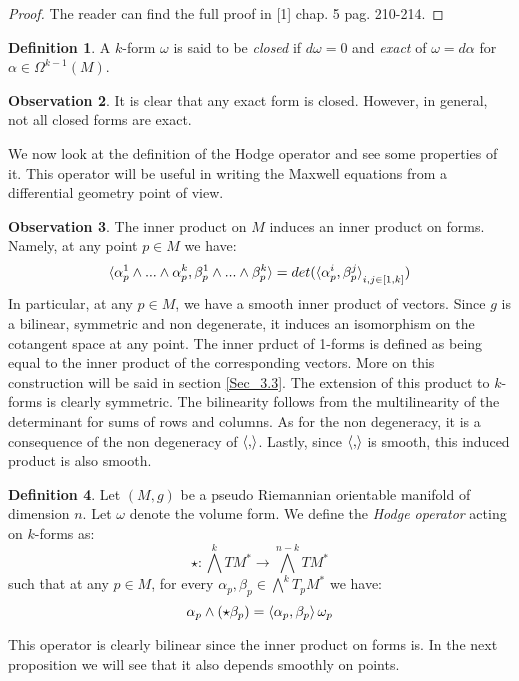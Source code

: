 \documentclass[12pt,a4paper]{report}
\theoremstyle{definition}
\newtheorem{Def}{Definition}[chapter]
\theoremstyle{Theorem}
\theoremstyle{definition}
\theoremstyle{definition}
\newtheorem{Obs}[Def]{Observation}
\begin{document}
	\begin{proof}
		The reader can find the full proof in [1] chap. 5 pag. 210-214.
	\end{proof}
	\begin{Def}
		A $k$-form $\omega$ is said to be \textit{closed} if $d\omega=0$ and \textit{exact} of $\omega=d\alpha$ for $\alpha\in\Omega^{k-1}(M)$.
	\end{Def}
	\begin{Obs}
		It is clear that any exact form is closed. However, in general, not all closed forms are exact.
	\end{Obs}
	We now look at the definition of the Hodge operator and see some properties of it. This operator will be useful in writing the Maxwell equations from a differential geometry point of view.
	\begin{Obs}
		The inner product on $M$ induces an inner product on forms. Namely, at any point $p\in M$ we have:
		$$\braket{\alpha^1_p\wedge...\wedge \alpha^k_p,\beta^1_p\wedge...\wedge\beta^k_p}=det(\braket{\alpha^i_p,\beta^j_p}_{i,j\in[1,k]})$$
		In particular, at any $p\in M$, we have a smooth inner product of vectors. Since $g$ is a bilinear, symmetric and non degenerate, it induces an isomorphism on the cotangent space at any point. The inner prduct of 1-forms is defined as being equal to the inner product of the corresponding vectors. More on this construction will be said in section \ref{Sec_3.3}.
		The extension of this product to $k$-forms is clearly symmetric. The bilinearity follows from the multilinearity of the determinant for sums of rows and columns. As for the non degeneracy, it is a consequence of the non degeneracy of $\braket{,}$. Lastly, since $\braket{,}$ is smooth, this induced product is also smooth.
	\end{Obs}
	\begin{Def}
		Let $(M,g)$ be a pseudo Riemannian orientable manifold of dimension $n$. Let $\omega$ denote the volume form. We define the \textit{Hodge operator} acting on $k$-forms as:
		$$\star:\bigwedge^kTM^*\rightarrow \bigwedge^{n-k}TM^*$$
		such that at any $p\in M$, for every $\alpha_p,\beta_p\in\bigwedge^kT_pM^*$ we have:
		$$\alpha_p\wedge(\star\beta_p)=\braket{\alpha_p,\beta_p}\omega_p$$
	\end{Def}
	This operator is clearly bilinear since the inner product on forms is. In the next proposition we will see that it also depends smoothly on points.
\end{document}
